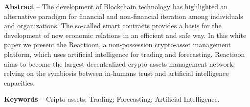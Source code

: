 \documentclass[
	article,			%
	12pt,				%
	oneside,			%
	a4paper,			%
	brazil,				%
	english,
	sumario=tradicional
	]{abntex2}
\begin{document}
\textual

\pagestyle{meuestilo}

\frenchspacing 

\maketitle

\thispagestyle{meuestilo}

\begin{changemargin}{1cm}{1cm} 
 \textbf{Abstract} – The development of Blockchain technology has highlighted an alternative paradigm for financial and non-financial iteration among individuals and organizations. The so-called smart contracts provides a basis for the development of new economic relations in an efficient and safe way. In this white paper we present the Reactioon, a non-possession crypto-asset management platform, which uses artificial intelligence for trading and forecasting. Reactioon aims to become the largest decentralized crypto-assets management network, relying on the symbiosis between in-humans trust and artificial intelligence capacities.
 

 \vspace{\onelineskip}
 
 \noindent
 \textbf{Keywords} – Cripto-assets; Trading; Forecasting; Artificial Intelligence. 
\end{changemargin}


\end{document}
